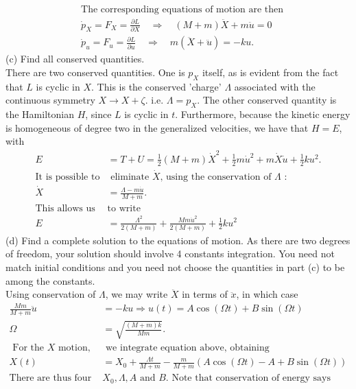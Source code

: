 \begin{enumerate}
\begin{answer}
\begin{align*}
	&\text{The corresponding equations of motion are then}\\
	&\dot{p}_{X}=F_{X}=\frac{\partial L}{\partial X} \quad \Rightarrow \quad(M+m) \ddot{X}+m \ddot{u}=0 \\
	&\dot{p}_{u}=F_{u}=\frac{\partial L}{\partial u} \quad \Rightarrow \quad m(\ddot{X}+\ddot{u})=-k u .
	\end{align*}
	(c) Find all conserved quantities.\\
	There are two conserved quantities. One is $p_{X}$ itself, as is evident from the fact that $L$ is cyclic in $X$. This is the conserved 'charge' $\Lambda$ associated with the continuous symmetry $X \rightarrow X+\zeta$. i.e. $\Lambda=p_{X}$. The other conserved quantity is the Hamiltonian $H$, since $L$ is cyclic in $t$. Furthermore, because the kinetic energy is homogeneous of degree two in the generalized velocities, we have that $H=E$, with
	\begin{align*}
	E&=T+U=\frac{1}{2}(M+m) \dot{X}^{2}+\frac{1}{2} m \dot{u}^{2}+m \dot{X} \dot{u}+\frac{1}{2} k u^{2} .\\
	\text{It is possible to}&\text{ eliminate $\dot{X}$, using the conservation of $\Lambda$ :}\\
	\dot{X}&=\frac{\Lambda-m \dot{u}}{M+m} .\\
	\text{This allows us }&\text{to write}\\
	E&=\frac{\Lambda^{2}}{2(M+m)}+\frac{M m \dot{u}^{2}}{2(M+m)}+\frac{1}{2} k u^{2}
	\end{align*}
	(d) Find a complete solution to the equations of motion. As there are two degrees of freedom, your solution should involve 4 constants integration. You need not match initial conditions and you need not choose the quantities in part (c) to be among the constants.\\
	Using conservation of $\Lambda$, we may write $\ddot{X}$ in terms of $\ddot{x}$, in which case
	\begin{align*}
	\frac{M m}{M+m} \ddot{u}&=-k u \Rightarrow u(t)=A \cos (\Omega t)+B \sin (\Omega t)\\
\text{}\Omega&=\sqrt{\frac{(M+m) k}{M m}} .\\
\text{	For the $X$ motion,}&\text{ we integrate equation above, obtaining}\\
X(t)&=X_{0}+\frac{\Lambda t}{M+m}-\frac{m}{M+m}(A \cos (\Omega t)-A+B \sin (\Omega t))\\
\text{There are thus four constant: }&\text{$X_{0}, \Lambda, A$ and $B$. Note that conservation of energy says}\\

\end{align*}
\end{answer}
\end{enumerate}

